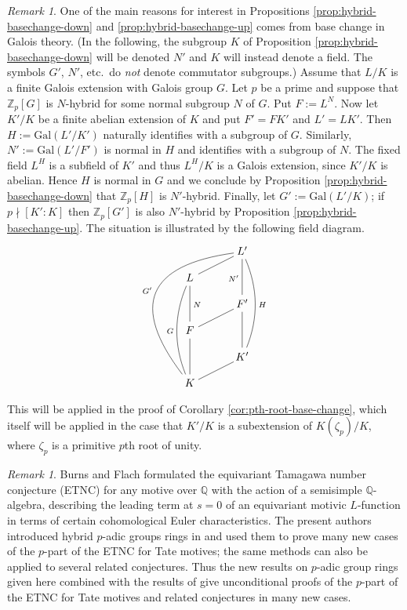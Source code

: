 \documentclass[12pt]{amsart}
\theoremstyle{plain}
\theoremstyle{remark}
\newtheorem{remark}[theorem]{Remark}
\theoremstyle{definition}
\numberwithin{equation}{section}
\begin{document}
\begin{remark}\label{rmk:hybrid-Galois-basechange}
One of the main reasons for interest in Propositions \ref{prop:hybrid-basechange-down} and \ref{prop:hybrid-basechange-up}
comes from base change in Galois theory.
(In the following, the subgroup $K$ of Proposition \ref{prop:hybrid-basechange-down} will be denoted $N'$
and $K$ will instead denote a field. The symbols $G'$, $N'$, etc.\ do \emph{not} denote commutator subgroups.)
Assume that $L/K$ is a finite Galois extension with Galois group $G$.
Let $p$ be a prime and suppose that ${\mathbb{Z}}_{p}[G]$ is $N$-hybrid for some normal subgroup $N$ of $G$.
Put $F := L^{N}$.
Now let $K'/K$ be a finite abelian extension of $K$ and put $F' = FK'$ and $L' = LK'$.
Then $H := {\mathrm{Gal}}(L'/K')$ naturally identifies with a subgroup of $G$.
Similarly, $N' := {\mathrm{Gal}}(L'/F')$ is normal in $H$ and identifies with a subgroup of $N$.
The fixed field $L^{H}$ is a subfield of $K'$ and thus $L^{H}/K$ is a Galois extension, since $K'/K$ is abelian.
Hence $H$ is normal in $G$ and we conclude by Proposition \ref{prop:hybrid-basechange-down}
that ${\mathbb{Z}}_{p}[H]$ is $N'$-hybrid. Finally, let $G' := {\mathrm{Gal}}(L'/K)$; if $p \nmid [K':K]$ then
 ${\mathbb{Z}}_{p}[G']$ is also $N'$-hybrid by Proposition \ref{prop:hybrid-basechange-up}.
The situation is illustrated by the following field diagram.
\[
\xymatrix@1@!0@W=14pt@H=14pt{
& & L'  \ar@{-}[dll] \ar@{-}[dd]_{N'} \ar@/^1pc/@{-}[dddd]^{H} \ar@{-}@/_5pc/[dddddll] _{G'} \\
L \ar@{-}[dd]^{N}  \ar@/_1pc/@{-}[dddd]_{G} & &   \\
& & F' \ar@{-}[dll] \ar@{-}[dd]  \\
F \ar@{-}[dd] & & \\
& & K' \ar@{-}[dll] \\
K & &
}
\]
This will be applied in the proof of Corollary \ref{cor:pth-root-base-change}, which itself will be applied in the case that
$K'/K$ is a subextension of $K(\zeta_{p})/K$, where $\zeta_{p}$ is a primitive $p$th root of unity.
\end{remark}

\begin{remark}\label{rmk:applications-to-ETNC}
Burns and Flach \cite{MR1884523} formulated
the equivariant Tamagawa number conjecture (ETNC)
for any motive over ${\mathbb{Q}}$ with the action of a semisimple ${\mathbb{Q}}$-algebra, 
describing the leading term at $s=0$ of an equivariant motivic $L$-function in terms of certain 
cohomological Euler characteristics. 
The present authors introduced hybrid $p$-adic groups rings in \cite{hybrid-ETNC} and used them to prove many new cases of the 
$p$-part of the ETNC for Tate motives; 
the same methods can also be applied to several related conjectures.
Thus the new results on $p$-adic group rings given here combined with the results of \cite{hybrid-ETNC}
give unconditional proofs of the $p$-part of the ETNC for Tate motives and related conjectures in many new cases.
\end{remark}
\end{document}
